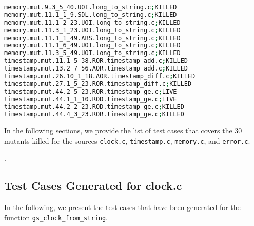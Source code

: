 \begin{lstlisting}[language=bash, label=statuses, caption=Mutants statuses.]
memory.mut.9.3_5_40.UOI.long_to_string.c;KILLED
memory.mut.11.1_1_9.SDL.long_to_string.c;KILLED
memory.mut.11.1_2_23.UOI.long_to_string.c;KILLED
memory.mut.11.3_1_23.UOI.long_to_string.c;KILLED
memory.mut.11.1_1_49.ABS.long_to_string.c;KILLED
memory.mut.11.1_6_49.UOI.long_to_string.c;KILLED
memory.mut.11.3_5_49.UOI.long_to_string.c;KILLED
timestamp.mut.11.1_5_38.ROR.timestamp_add.c;KILLED
timestamp.mut.13.2_7_56.AOR.timestamp_add.c;KILLED
timestamp.mut.26.10_1_18.AOR.timestamp_diff.c;KILLED
timestamp.mut.27.1_5_23.ROR.timestamp_diff.c;KILLED
timestamp.mut.44.2_5_23.ROR.timestamp_ge.c;LIVE
timestamp.mut.44.1_1_10.ROD.timestamp_ge.c;LIVE
timestamp.mut.44.2_2_23.ROD.timestamp_ge.c;KILLED
timestamp.mut.44.4_3_23.ROR.timestamp_ge.c;KILLED
\end{lstlisting}

In the following sections, we provide the list of test cases that covers the 30 mutants killed for the sources \texttt{clock.c}, \texttt{timestamp.c}, \texttt{memory.c}, and \texttt{error.c}.

.

\newpage
\subsection{Test Cases Generated for clock.c}

In the following, we present the test cases that have been generated for the function \texttt{gs\_clock\_from\_string}.



